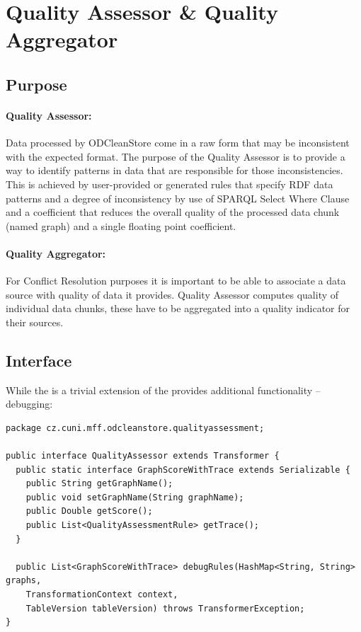 \section{Quality Assessor \& Quality Aggregator}
\label{sec:QA}
\subsection{Purpose}

\paragraph{Quality Assessor:}
Data processed by ODCleanStore come in a raw form that may be inconsistent with the expected format. The purpose of the Quality Assessor is to provide a way to identify patterns in data that are responsible for those inconsistencies. This is achieved by user-provided or generated rules that specify RDF data patterns and a degree of inconsistency by use of SPARQL Select Where Clause and a coefficient that reduces the overall quality of the processed data chunk (named graph) and a single floating point coefficient.

\paragraph{Quality Aggregator:}
For Conflict Resolution purposes it is important to be able to associate a data source with quality of data it provides. Quality Assessor computes quality of individual data chunks, these have to be aggregated into a quality indicator for their sources.

\subsection{Interface}

While the  is a trivial extension of  the  provides additional functionality -- debugging:

\begin{lstlisting}[caption=Quality Assessor interface,label=lst:qualityAssessor]
package cz.cuni.mff.odcleanstore.qualityassessment;

public interface QualityAssessor extends Transformer {
  public static interface GraphScoreWithTrace extends Serializable {
    public String getGraphName();
    public void setGraphName(String graphName);
    public Double getScore();
    public List<QualityAssessmentRule> getTrace();
  }

  public List<GraphScoreWithTrace> debugRules(HashMap<String, String> graphs,
    TransformationContext context,
    TableVersion tableVersion) throws TransformerException;
}
\end{lstlisting}

